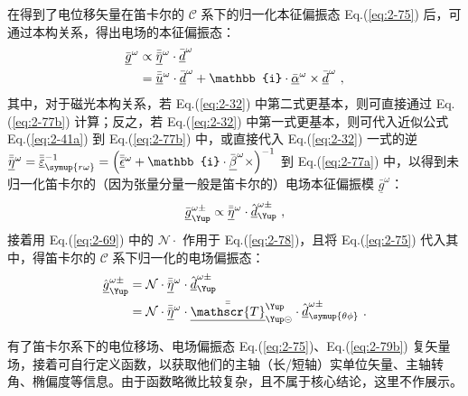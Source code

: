 在得到了电位移矢量在笛卡尔的 $\mathcal{C}$ 系下的归一化本征偏振态 Eq.(\ref{eq:2-75}) 后，可通过本构关系，得出电场的本征偏振态：
\begin{subequations} \label{eq:2-77}
\begin{align}
	\abovedisplayskip=16pt
	\belowdisplayskip=16pt
	\bar{\underline{g}}^{\omega} &\propto \bar{\bar{\underline{\eta}}}^{\omega} \cdot \bar{\underline{d}}^{\omega} \label{eq:2-77a} \\ &= \bar{\bar{\underline{u}}}^\omega \cdot \bar{\underline{d}}^{\omega} + \mathbb{i} \cdot {\bar{\underline{\alpha}}^\omega} \times \bar{\underline{d}}^{\omega}  \label{eq:2-77b} ~,
\end{align}
\end{subequations}
其中，对于磁光本构关系，若 Eq.(\ref{eq:2-32}) 中第二式更基本，则可直接通过 Eq.(\ref{eq:2-77b}) 计算；反之，若 Eq.(\ref{eq:2-32}) 中第一式更基本，则可代入近似公式 Eq.(\ref{eq:2-41a}) 到 Eq.(\ref{eq:2-77b}) 中，或直接代入 Eq.(\ref{eq:2-32}) 一式的逆 $\bar{\bar{\underline{\eta}}}^{\omega} = \bar{\bar{\underline{\varepsilon}}}_{\symup{r\omega}}^{-1} = \left( \bar{\bar{\underline{\epsilon}}}^{\omega} + \mathbb{i} \cdot {\bar{\underline {\beta}}^\omega} \times \right)^{-1}$ 到 Eq.(\ref{eq:2-77a}) 中，以得到未归一化笛卡尔的（因为张量分量一般是笛卡尔的）电场本征偏振模 $\bar{\underline{g}}^{\omega}$：
\begin{equation} \label{eq:2-78}
	\abovedisplayskip=16pt
	\belowdisplayskip=16pt
	\bar{\underline{g}}^{\omega\pm}_{\Yup} \propto \bar{\bar{\underline{\eta}}}^{\omega} \cdot \hat{\underline{d}}^{\omega\pm}_{\Yup} ~,
\end{equation}
接着用 Eq.(\ref{eq:2-69}) 中的 $\mathcal{N} \cdot$ 作用于 Eq.(\ref{eq:2-78})，且将 Eq.(\ref{eq:2-75}) 代入其中，得笛卡尔的 $\mathcal{C}$ 系下归一化的电场偏振态：
\begin{subequations} \label{eq:2-79}
\begin{align}
	\abovedisplayskip=16pt
	\belowdisplayskip=16pt
	\hat{\underline{g}}^{\omega\pm}_{\Yup} &= \mathcal{N} \cdot \bar{\bar{\underline{\eta}}}^{\omega} \cdot \hat{\underline{d}}^{\omega\pm}_{\Yup} \label{eq:2-79a} \\&= \mathcal{N} \cdot \bar{\bar{\underline{\eta}}}^{\omega} \cdot \bar{\bar{\underline{\mathscr{T}}}}^{\Yup}_{\Yup\circleddash} \cdot \hat{\underline{d}}^{\omega\pm}_{\symup{\theta\phi}} \label{eq:2-79b}~.
\end{align}
\end{subequations}

有了笛卡尔系下的电位移场、电场偏振态 Eq.(\ref{eq:2-75})、Eq.(\ref{eq:2-79b}) 复矢量场，接着可自行定义函数，以获取他们的主轴（长/短轴）实单位矢量、主轴转角、椭偏度等信息。由于函数略微比较复杂，且不属于核心结论，这里不作展示。

